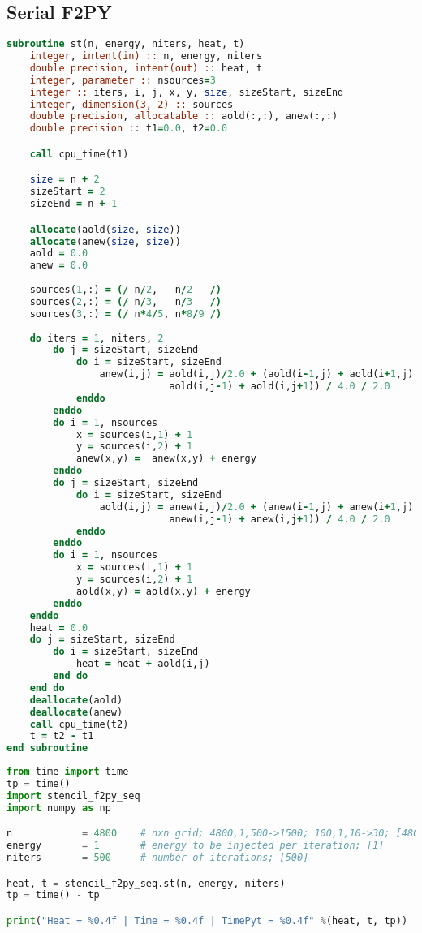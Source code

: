 \subsection{Serial F2PY}
\begin{lstlisting}[language=Fortran, caption={Serial F2PY implementation of the stencil test case - F90 code.}]
subroutine st(n, energy, niters, heat, t)
    integer, intent(in) :: n, energy, niters
    double precision, intent(out) :: heat, t   
    integer, parameter :: nsources=3
    integer :: iters, i, j, x, y, size, sizeStart, sizeEnd
    integer, dimension(3, 2) :: sources
    double precision, allocatable :: aold(:,:), anew(:,:)
    double precision :: t1=0.0, t2=0.0

    call cpu_time(t1)

    size = n + 2
    sizeStart = 2
    sizeEnd = n + 1

    allocate(aold(size, size))
    allocate(anew(size, size))
    aold = 0.0
    anew = 0.0
    
    sources(1,:) = (/ n/2,   n/2   /)
    sources(2,:) = (/ n/3,   n/3   /)
    sources(3,:) = (/ n*4/5, n*8/9 /)
    
    do iters = 1, niters, 2
        do j = sizeStart, sizeEnd
            do i = sizeStart, sizeEnd
                anew(i,j) = aold(i,j)/2.0 + (aold(i-1,j) + aold(i+1,j) +  &
                            aold(i,j-1) + aold(i,j+1)) / 4.0 / 2.0
            enddo
        enddo
        do i = 1, nsources
            x = sources(i,1) + 1
            y = sources(i,2) + 1
            anew(x,y) =  anew(x,y) + energy
        enddo
        do j = sizeStart, sizeEnd
            do i = sizeStart, sizeEnd
                aold(i,j) = anew(i,j)/2.0 + (anew(i-1,j) + anew(i+1,j) +  &
                            anew(i,j-1) + anew(i,j+1)) / 4.0 / 2.0
            enddo
        enddo
        do i = 1, nsources
            x = sources(i,1) + 1
            y = sources(i,2) + 1
            aold(x,y) = aold(x,y) + energy
        enddo
    enddo
    heat = 0.0
    do j = sizeStart, sizeEnd
        do i = sizeStart, sizeEnd
            heat = heat + aold(i,j)
        end do
    end do
    deallocate(aold)
    deallocate(anew)
    call cpu_time(t2)
    t = t2 - t1
end subroutine
\end{lstlisting}




\begin{lstlisting}[language=Python, caption={Serial F2PY implementation of the stencil test case - Python code.}]
from time import time
tp = time()
import stencil_f2py_seq
import numpy as np

n            = 4800    # nxn grid; 4800,1,500->1500; 100,1,10->30; [4800]
energy       = 1       # energy to be injected per iteration; [1]
niters       = 500     # number of iterations; [500]

heat, t = stencil_f2py_seq.st(n, energy, niters)
tp = time() - tp

print("Heat = %0.4f | Time = %0.4f | TimePyt = %0.4f" %(heat, t, tp))
\end{lstlisting}




